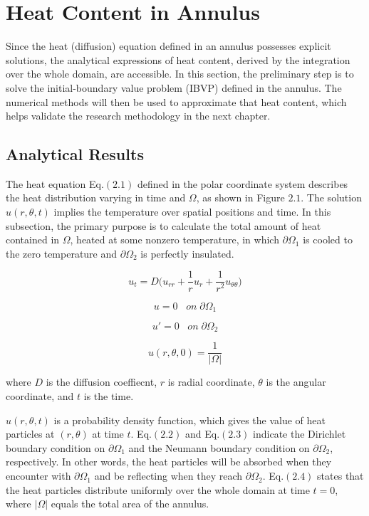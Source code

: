 \section{Heat Content in Annulus}

Since the heat (diffusion) equation defined in an annulus possesses explicit
solutions, the analytical expressions of heat content, derived by the
integration over the whole domain, are accessible. In this section,
the preliminary step is to solve the initial-boundary value problem
(IBVP) defined in the annulus. The numerical methods will then be used
to approximate that heat content, which helps validate the research
methodology in the next chapter.

\subsection{Analytical Results}

The heat equation Eq.$(2.1)$ defined in the polar coordinate system
describes the heat distribution varying in time and $\Omega$, as shown
in Figure $2.1$. The solution $u(r, \theta, t)$ implies the
temperature over spatial positions and time. In this subsection, the
primary purpose is to calculate the total amount of heat contained in
$\Omega$, heated at some nonzero temperature, in which $\partial
\Omega_{1}$ is cooled to the zero temperature and $\partial
\Omega_{2}$ is perfectly insulated.

\begin{equation}
  u_t = D \big(u_{rr} + \frac{1}{r} u_r + \frac{1}{r^2} u_{\theta\theta}\big)  
\end{equation}

\begin{equation}
  u = 0 \; \; \; on \; \partial \Omega_1
\end{equation}

\begin{equation}
  u' = 0 \; \; \; on \; \partial \Omega_2
\end{equation}


\begin{equation}
  u(r, \theta, 0) = \frac{1}{|\Omega|}
\end{equation}


where $D$ is the diffusion coeffiecnt, $r$ is radial coordinate,
$\theta$ is the angular coordinate, and $t$ is the time.

$u(r, \theta, t)$ is a probability density function, which gives the
value of heat particles at $(r, \theta)$ at time $t$. Eq.$(2.2)$ and
Eq.$(2.3)$ indicate the Dirichlet boundary condition on $\partial
\Omega_1$ and the Neumann boundary condition on $\partial \Omega_2$,
respectively. In other words, the heat particles will be absorbed when
they encounter with $\partial \Omega_1$ and be reflecting when they
reach $\partial \Omega_2$. Eq.$(2.4)$ states that the heat particles
distribute uniformly over the whole domain at time $t=0$, where
$|\Omega|$ equals the total area of the annulus.


